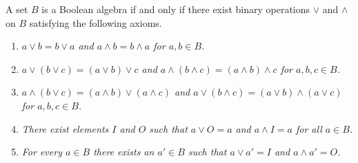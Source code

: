  
\begin{theorem}
A set $B$ is a Boolean algebra if and only if there exist binary
operations $\vee$ and $\wedge$ on $B$ satisfying the following axioms.
\begin{enumerate}
 
\rm \item \it
$a \vee b = b \vee a$ and $a \wedge b = b \wedge a$ for $a, b \in B$.
 
\rm \item \it
$a \vee ( b \vee c) = (a \vee b) \vee c$ and 
$a \wedge ( b \wedge c) = (a \wedge b) \wedge c$ 
for $a, b, c \in B$.
 
\rm \item \it
$a \wedge ( b \vee c ) = (a \wedge b ) \vee ( a \wedge c )$ and 
$a \vee ( b \wedge c ) = (a \vee b ) \wedge ( a \vee c )$  
for $a, b, c \in B$.
 
\rm \item \it
There exist elements $I$ and $O$ such that $a \vee O = a$ and $a
\wedge I = a$ for all $a \in B$.
 
\rm \item \it
For every $a \in B$ there exists an $a' \in B$ such that $a \vee a' =
I$ and $a \wedge a' = O$.
 
\end{enumerate}
\end{theorem}
 
